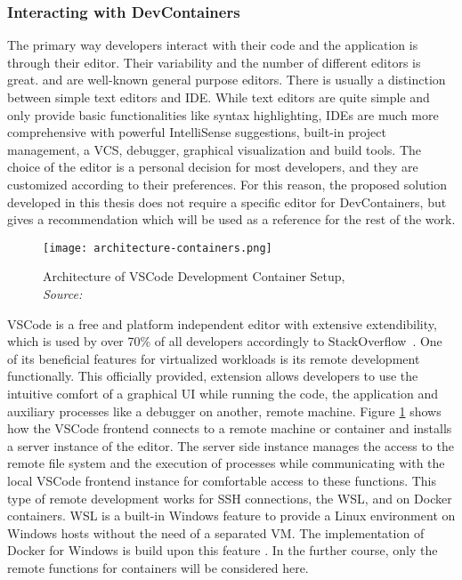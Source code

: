         \subsubsection{Interacting with DevContainers}
        The primary way developers interact with their code and the application is through their editor. Their variability and the number of different editors is great.  and  are well-known general purpose editors. There is usually a distinction between simple text editors and \acl{IDE}. While text editors are quite simple and only provide basic functionalities like syntax highlighting, \ac{IDE}s are much more comprehensive with powerful IntelliSense suggestions, built-in project management, a \ac{VCS}, debugger, graphical visualization and build tools. The choice of the editor is a personal decision for most developers, and they are customized according to their preferences. For this reason, the proposed solution developed in this thesis does not require a specific editor for DevContainers, but gives a recommendation which will be used as a reference for the rest of the work.
        \begin{figure}
            \centering
            \captionsetup{justification=centering}
            \texttt{[image: architecture-containers.png]}
            \caption{Architecture of \ac{VSCode} Development Container Setup, \\\textit{Source:~\cite{vscodedevcontainer}}}\label{fig::vscodecontainer}
        \end{figure}
        \ac{VSCode} is a free and platform independent editor with extensive extendibility, which is used by over 70\% of all developers accordingly to StackOverflow~\cite{stackoverflow2021}. One of its beneficial features for virtualized workloads is its remote development functionally. This officially provided, extension allows developers to use the intuitive comfort of a graphical \ac{UI} while running the code, the application and auxiliary processes like a debugger on another, remote machine. Figure \ref{fig::vscodecontainer} shows how the \ac{VSCode} frontend connects to a remote machine or container and installs a server instance of the editor. The server side instance manages the access to the remote file system and the execution of processes while communicating with the local \ac{VSCode} frontend instance for comfortable access to these functions. This type of remote development works for \ac{SSH} connections, the \ac{WSL}, and on Docker containers. \ac{WSL} is a built-in Windows feature to provide a Linux environment on Windows hosts without the need of a separated \ac{VM}. The implementation of Docker for Windows is build upon this feature \cite{vscodedevcontainer}. In the further course, only the remote functions for containers will be considered here.\newline
